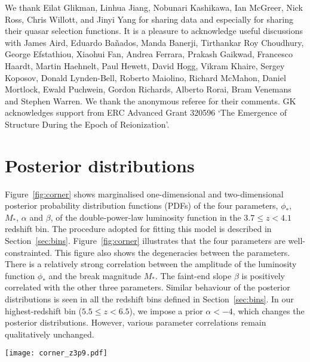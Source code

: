 \documentclass[fleqn,usenatbib]{mnras}
\newcommand{\new}[1]{{\color{notecolor} #1}}
\begin{document}
We thank Eilat Glikman, Linhua Jiang, Nobunari Kashi\-kawa, Ian
McGreer, Nick Ross, Chris Willott, and Jinyi Yang for sharing data and
especially for sharing their quasar selection functions.  It is a
pleasure to acknowledge useful discussions with James Aird, Eduardo
Ba\~nados, Manda Banerji, Tirthankar Roy Choudhury, George Efstathiou,
Xiaohui Fan, Andrea Ferrara, Prakash Gaikwad, Francesco Haardt, Martin
Haehnelt, Paul Hewett, David Hogg, Vikram Khaire, Sergey Koposov,
Donald Lynden-Bell, Roberto Maiolino, Richard McMahon, Daniel
Mortlock, Ewald Puchwein, Gordon Richards, Alberto Rorai, Bram
Venemans and Stephen Warren.  \new{We thank the anonymous referee for
  their comments.} GK acknowledges support from ERC Advanced Grant
320596 `The Emergence of Structure During the Epoch of Reionization'.

\appendix

\section{Posterior distributions}

Figure~\ref{fig:corner} shows marginalised one-dimensional and
two-dimensional posterior probability distribution functions (PDFs) of
the four parameters, $\phi_*$, $M_*$, $\alpha$ and $\beta$, of the
double-power-law luminosity function in the $3.7\leq z < 4.1$ redshift
bin.  The procedure adopted for fitting this model is described in
Section~\ref{sec:bins}.  Figure~\ref{fig:corner} illustrates that the
four parameters are well-constrainted.  This figure also shows the
degeneracies between the parameters.  There is a relatively strong
correlation between the amplitude of the luminosity function $\phi_*$
and the break magnitude $M_*$.  The faint-end slope $\beta$ is
positively correlated with the other three parameters.  Similar
behaviour of the posterior distributions is seen in all the redshift
bins defined in Section~\ref{sec:bins}.  In our highest-redshift bin
($5.5\leq z < 6.5$), we impose a prior $\alpha < -4$, which changes
the posterior distributions.  However, various parameter correlations
remain qualitatively unchanged.

\begin{figure*}
  \begin{center}
    \texttt{[image: corner\_z3p9.pdf]}
  \end{center}
  \caption{Posterior distributions of the four double-power-law
    parameters in the $3.7\leq z < 4.1$ redshift bin.  The blue
    squares indicate median values.  Similar behaviour of the
    posterior distributions is seen in all other redshift bins defined
    in Section~\ref{sec:bins}.
    \label{fig:corner}}
\end{figure*}
\end{document}
